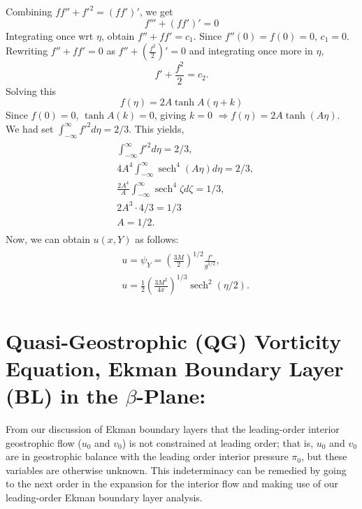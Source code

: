 \documentclass{article}
\DeclareMathOperator{\sech}{sech}
\begin{document}
Combining $ff'' + f'^{2} = (ff')'$, we get\
\begin{equation}
 f''' + (ff')' = 0
\end{equation}
Integrating once wrt $\eta$, obtain $f'' + ff' = c_{1}$. Since $f''(0) = f(0) = 0$, $\boxed{c_{1} = 0}$. Rewriting $f'' + ff' = 0$ as $f'' + \left(\frac{f^{2}}{2}\right)' = 0$ and integrating once more in $\eta$, 
\begin{equation}
 f'+ \frac{f^{2}}{2} = c_{2}.
\end{equation}
Solving this
\begin{equation}
 f(\eta) = 2A \tanh{A(\eta + k)}
\end{equation}
Since $f(0) = 0$, $\tanh{A(k)} = 0$, giving $\boxed{k = 0}$ $\Rightarrow \boxed{f(\eta) = 2A \tanh{(A\eta)}}  $.\\
%
We had set $\int_{-\infty}^{\infty} f'^{2}d\eta = 2/3$. This yields,
\begin{align}
 \begin{split}
  & \int_{-\infty}^{\infty} f'^{2}d\eta = 2/3, \\
  & 4 A^{4} \int_{-\infty}^{\infty} \sech^{4}{(A\eta)}d\eta = 2/3,\\
  &\frac{2A^{4}}{A}\int_{-\infty}^{\infty} \sech^{4}{\zeta} d\zeta = 1/3,\\
  & 2 A^{3} \cdot 4/3 = 1/3\\
  & \boxed{A = 1/2}.
 \end{split}
\end{align}
%
Now, we can obtain $u(x, Y)$ as follows:
\begin{align}
 \begin{split}
  & u = \psi_{Y} =  \left(\frac{3M}{2}\right)^{1/2} \frac{f'}{g^{1/2}}, \\
  & \boxed{u =\frac{1}{2}\left(\frac{3M^{2}}{4x}\right)^{1/3}\sech^{2}{(\eta/2)} }.
 \end{split}
\end{align}
\section{Quasi-Geostrophic (QG) Vorticity Equation, Ekman Boundary Layer (BL) in the $\beta$-Plane:}
From our discussion of Ekman boundary layers that the leading-order interior geostrophic flow ($u_{0}$ and $v_{0}$) is not constrained at leading order; that is, $u_{0}$ and $v_{0}$ are in geostrophic balance with the leading order interior pressure $\pi_{0}$, but these variables are otherwise unknown. This indeterminacy can be remedied by going to the next order in the expansion for the interior flow and making use of our leading-order Ekman boundary layer analysis.
\end{document}
